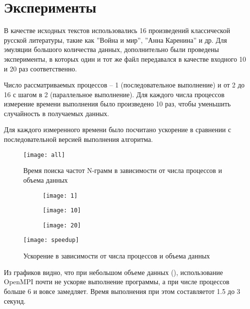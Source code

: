 \section{Эксперименты}

В качестве исходных текстов использовались 16 произведений классической русской литературы, такие как ''Война и мир'', ''Анна Каренина'' и др. Для эмуляции большого количества данных, дополнительно были проведены эксперименты, в которых один и тот же файл передавался в качестве входного 10 и 20 раз соответственно.

Число рассматриваемых процессов -- 1 (последовательное выполнение) и от 2 до 16 с шагом в 2 (параллельное выполнение). Для каждого числа процессов измерение времени выполнения было произведено 10 раз, чтобы уменьшить случайность в получаемых данных. 

Для каждого измеренного времени было посчитано ускорение в сравнении с последовательной версией выполнения алгоритма.

\begin{figure}[H]
	\centering
	\texttt{[image: all]}
	\caption{Время поиска частот N-грамм в зависимости от числа процессов и объема данных}
\end{figure}

\begin{figure}[H]
	\centering
	\begin{subfigure}{0.5\linewidth}
		\texttt{[image: 1]}
		\caption{}
	\end{subfigure}
	\begin{subfigure}{0.49\linewidth}
		\texttt{[image: 10]}
		\caption{}
	\end{subfigure}
	\begin{subfigure}{0.49\linewidth}
		\texttt{[image: 20]}
		\caption{}
	\end{subfigure}
\end{figure}

\begin{figure}[H]
	\centering
	\texttt{[image: speedup]}
	\caption{Ускорение в зависимости от числа процессов и объема данных}
\end{figure}

Из графиков видно, что при небольшом объеме данных (), использование OpenMPI почти не ускоряе выполнение программы, а при числе процессов больше 6 и вовсе замедляет. Время выполнения при этом составляетот 1.5 до 3 секунд.

